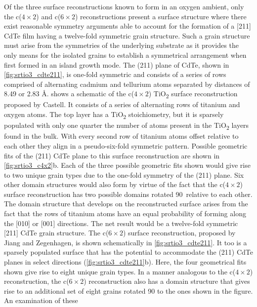 Of the three surface reconstructions known to form in an
oxygen ambient, only the c($4\times2$) and c($6\times2$) reconstructions
present a surface structure where there exist reasonable symmetry
arguments able to account for the formation of a [211] CdTe film
having a twelve-fold symmetric grain structure. Such a grain
structure must arise from the symmetries of the underlying
substrate as it provides the only means for the isolated grains to
establish a symmetrical arrangement when first formed in an
island growth mode. The (211) plane of CdTe, shown in \cref{fig:srtio3_cdte211}, is
one-fold symmetric and consists of a series of rows comprised of
alternating cadmium and tellurium atoms separated by distances of 8.49 or 2.83 \AA.  shows a schematic of the c($4\times2$) TiO\textsubscript{2} surface reconstruction proposed by Castell\cite{Castell2002}. It consists of a
series of alternating rows of titanium and oxygen atoms. The top
layer has a TiO\textsubscript{2} stoichiometry, but it is sparsely populated with
only one quarter the number of atoms present in the TiO\textsubscript{2} layers
found in the bulk\cite{Castell2002}. With every second row of titanium atoms
offset relative to each other they align in a pseudo-six-fold
symmetric pattern. Possible geometric fits of the (211) CdTe plane
to this surface reconstruction are shown in \cref{fig:srtio3_c4x2}b. Each of the three
possible geometric fits shown would give rise to two unique grain
types due to the one-fold symmetry of the (211) plane. Six other
domain structures would also form by virtue of the fact that the
c($4\times2$) surface reconstruction has two possible domains rotated
90\degree~relative to each other\cite{Castell2002}. The domain structure that develops
on the reconstructed surface arises from the fact that the rows of
titanium atoms have an equal probability of forming along the
[010] or [001] directions. The net result would be a twelve-fold
symmetric [211] CdTe grain structure. The c($6\times2$) surface
reconstruction, proposed by Jiang and Zegenhagen\cite{Jiang1996}, is shown
schematically in \cref{fig:srtio3_cdte211}. It too is a sparsely populated surface that
has the potential to accommodate the (211) CdTe planes in select
directions (\cref{fig:srtio3_cdte211}b). Here, the four geometrical fits shown give rise
to eight unique grain types. In a manner analogous to the c($4\times2$)
reconstruction, the c($6\times2$) reconstruction also has a domain
structure that gives rise to an additional set of eight grains rotated
90\degree{} to the ones shown in the figure. An examination of these
